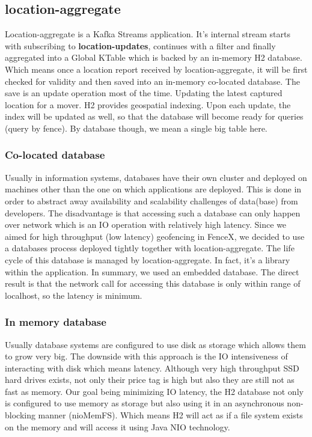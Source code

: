 \documentclass[a4]{report}
\begin{document}
    \subsection{location-aggregate}
    Location-aggregate is a Kafka Streams application.
    It's internal stream starts with subscribing to \textbf{location-updates}, continues with a filter and finally
    aggregated into a Global KTable which is backed by an in-memory H2 database.
    Which means once a location report received by location-aggregate, it will be first checked for validity and then
    saved into an in-memory co-located database.
    The save is an update operation most of the time.
    Updating the latest captured location for a mover.
    H2 provides geospatial indexing.
    Upon each update, the index will be updated as well, so that the database will become ready for queries (query by
    fence).
    By database though, we mean a single big table here.

    \subsubsection{Co-located database}
    Usually in information systems, databases have their own cluster and deployed on machines other than the one on
    which applications are deployed.
    This is done in order to abstract away availability and scalability challenges of data(base) from developers.
    The disadvantage is that accessing such a database can only happen over network which is an IO operation with
    relatively high latency.
    Since we aimed for high throughput (low latency) geofencing in FenceX, we decided to use a databases process
    deployed tightly together with location-aggregate.
    The life cycle of this database is managed by location-aggregate.
    In fact, it's a library within the application.
    In summary, we used an embedded database.
    The direct result is that the network call for accessing this database is only within range of localhost, so the
    latency is minimum.

    \subsubsection{In memory database}
    Usually database systems are configured to use disk as storage which allows them to grow very big.
    The downside with this approach is the IO intensiveness of interacting with disk which means latency.
    Although very high throughput SSD hard drives exists, not only their price tag is high but also they are still
    not as fast as memory.
    Our goal being minimizing IO latency, the H2 database not only is configured to use memory as storage but also
    using it in an asynchronous non-blocking manner (nioMemFS).
    Which means H2 will act as if a file system exists on the memory and will access it using Java NIO \cite{JavaNio} technology.
\end{document}
